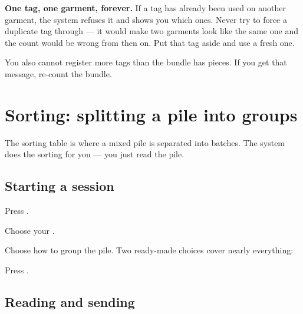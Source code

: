 \begin{stopbox}
\textbf{One tag, one garment, forever.} If a tag has already been used on another
garment, the system refuses it and shows you which ones. Never try to force a
duplicate tag through --- it would make two garments look like the same one and
the count would be wrong from then on. Put that tag aside and use a fresh one.
\end{stopbox}

You also cannot register more tags than the bundle has pieces. If you get that
message, re-count the bundle.

\section{Sorting: splitting a pile into groups}

The sorting table is where a mixed pile is separated into batches. The system
does the sorting for you --- you just read the pile.


\subsection{Starting a session}

\begin{steps}
  \item Press .
  \item Choose your .
  \item Choose how to group the pile. Two ready-made choices cover nearly
        everything:
        \begin{bullets}
          \item {}
          \item {}
        \end{bullets}
  \item Press .
\end{steps}


\subsection{Reading and sending}

